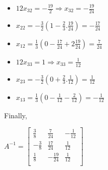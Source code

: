 \begin{exercise}{6}
\begin{itemize}
\item $12x_{32} = -\frac{19}{2} \Rightarrow x_{32} = -\frac{19}{24}$
\item $x_{22} = -\frac{3}{2}(1-\frac{2}{3}.\frac{19}{24}) = -\frac{17}{24}$
\item $x_{12} = \frac{1}{3}(0-\frac{17}{24}+2\frac{19}{24}) = \frac{7}{24}$
\end{itemize}

\begin{itemize}
\item $12x_{33} = 1 \Rightarrow x_{33} = \frac{1}{12}$
\item $x_{23} = -\frac{3}{2}(0+\frac{2}{3}.\frac{1}{12}) = \frac{1}{12}$
\item $x_{13} = \frac{1}{3}(0-\frac{1}{12}-\frac{2}{12}) = -\frac{1}{12}$
\end{itemize}

Finally,
\begin{center}
$A^{-1} = \begin{bmatrix}
\frac{3}{8}&\frac{7}{24}&-\frac{1}{12}\\ 
-\frac{3}{8}&\frac{17}{24}&\frac{1}{12}\\ 
\frac{1}{8}&-\frac{19}{24}&\frac{1}{12}\\ 
\end{bmatrix}
$
\end{center}
\end{exercise}

